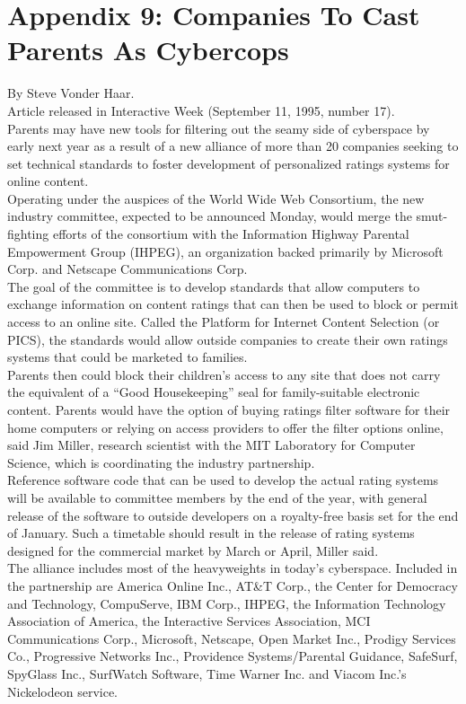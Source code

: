 \chapter{Appendix 9: Companies To Cast Parents As Cybercops}
\label{par_cast}

By Steve Vonder Haar.\\

Article released in Interactive Week (September 11, 1995, number 17).\\

Parents may have new tools for filtering out the seamy side of
cyberspace by early next year as a result of a new alliance of more
than 20 companies seeking to set technical standards to foster
development of personalized ratings systems for online content.\\

Operating under the auspices of the World Wide Web Consortium, the new
industry committee, expected to be announced Monday, would merge the
smut-fighting efforts of the consortium with the Information Highway
Parental Empowerment Group (IHPEG), an organization backed primarily by
Microsoft Corp. and Netscape Communications Corp.\\

The goal of the committee is to develop standards that allow computers
to exchange information on content ratings that can then be used to
block or permit access to an online site. Called the Platform for
Internet Content Selection (or PICS), the standards would allow outside
companies to create their own ratings systems that could be marketed to
families.\\

Parents then could block their children's access to any site that does
not carry the equivalent of a ``Good Housekeeping'' seal for
family-suitable electronic content. Parents would have the option of
buying ratings filter software for their home computers or relying on
access providers to offer the filter options online, said Jim Miller,
research scientist with the MIT Laboratory for Computer Science, which
is coordinating the industry partnership.\\

Reference software code that can be used to develop the actual rating
systems will be available to committee members by the end of the year,
with general release of the software to outside developers on a
royalty-free basis set for the end of January. Such a timetable should
result in the release of rating systems designed for the commercial
market by March or April, Miller said.\\

The alliance includes most of the heavyweights in today's cyberspace.
Included in the partnership are America Online Inc., AT\&T Corp., the
Center for Democracy and Technology, CompuServe, IBM Corp., IHPEG, the
Information Technology Association of America, the Interactive Services
Association, MCI Communications Corp., Microsoft, Netscape, Open Market
Inc., Prodigy Services Co., Progressive Networks Inc., Providence
Systems/Parental Guidance, SafeSurf, SpyGlass Inc., SurfWatch Software,
Time Warner Inc. and Viacom Inc.'s Nickelodeon service.

